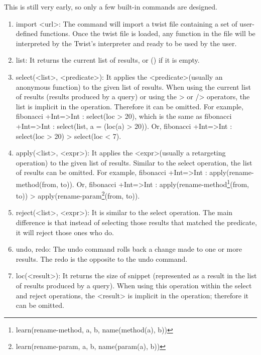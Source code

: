 This is still very early, so only a few built-in commands are designed.

\begin{enumerate}
	\item import <url>: The command will import a twist file containing a set of 
	user-defined functions. Once the twist file is loaded, any function in the file will 
	be interpreted by the Twist's interpreter and ready to be used by the user.
	
	\item list: It returns the current list of results, or () if it is empty.
	
	\item select(<list>, <predicate>): It applies the <predicate>(usually an anonymous function) 
	to the given list of results. When using the current list of results (results produced by a 
	query) or using the > or /> operators, the list is implicit in the operation. Therefore it can 
	be omitted. For example, fibonacci +Int=>Int : select(loc > 20), which is the same as 
	fibonacci +Int=>Int : select(list, a = (loc(a) > 20)). Or, fibonacci +Int=>Int : select(loc > 
	20) > select(loc < 7).
	
	\item apply(<list>, <expr>): It applies the <expr>(usually a retargeting operation) 
	to the given list of results. Similar to the select operation, the list of results can be 
	omitted. For example, fibonacci +Int=>Int : apply(rename-method(from, to)). Or, fibonacci 
	+Int=>Int : apply(rename-method\footnote{learn(rename-method, a, b, name(method(a), b))}(from, 
	to)) > apply(rename-param\footnote{learn(rename-param, a, b, name(param(a), b))}(from, to)).
		
	\item reject(<list>, <expr>): It is similar to the select operation. The main difference is 
	that instead of selecting those results that matched the predicate, it will reject those ones 
	who do. 
	
	\item undo, redo: The undo command rolls back a change made to one or more results. 
	The redo is the opposite to the undo command.  
	
	\item loc(<result>): It returns the size of snippet (represented as a result in the 
	list of results produced by a query). When using this operation within the select and reject 
	operations, the <result> is implicit in the operation; therefore it can be omitted. 
	

\end{enumerate}
